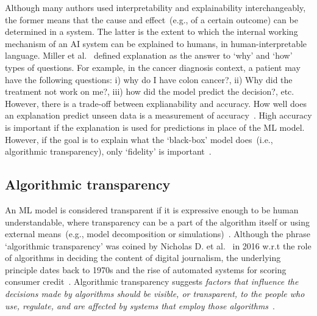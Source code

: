 \hspace*{3.5mm} Although many authors used interpretability and explainability interchangeably, the former means that the cause and effect~(e.g., of a certain outcome) can be determined in a system. The latter is the extent to which the internal working mechanism of an AI system can be explained to humans, in human-interpretable language. Miller et al.~\cite{miller2018explanation} defined explanation as the answer to `why' and `how' types of questions. For example, in the cancer diagnosis context, a patient may have the following questions: i) why do I have colon cancer?, ii) Why did the treatment not work on me?, iii) how did the model predict the decision?, etc. However, there is a trade-off between explianability and accuracy. How well does an explanation predict unseen data is a measurement of accuracy~\cite{molnar2019interpretable}. High accuracy is important if the explanation is used for predictions in place of the ML model. However, if the goal is to explain what the `black-box' model does~(i.e., algorithmic transparency), only `fidelity' is important~\cite{molnar2019interpretable}. 

\subsection{Algorithmic transparency}
An ML model is considered transparent if it is expressive enough to be human understandable, where transparency can be a part of the algorithm itself or using external means~(e.g., model decomposition or simulations)~\cite{das2020opportunities}. Although the phrase `algorithmic transparency' was coined by Nicholas D. et al.~\cite{diakopoulos2017algorithmic} in 2016 w.r.t the role of algorithms in deciding the content of digital journalism, the underlying principle dates back to 1970s and the rise of automated systems for scoring consumer credit~\cite{diakopoulos2015algorithmic}.  Algorithmic transparency suggests \textit{factors that influence the decisions made by algorithms should be visible, or transparent, to the people who use, regulate, and are affected by systems that employ those algorithms}~\cite{diakopoulos2017algorithmic}.  %

